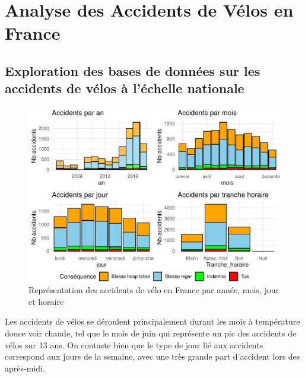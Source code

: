 \documentclass[french,]{compterendu}
\theoremstyle{urcastyle}
\theoremstyle{remark}
\begin{document}
\hypertarget{analyse-des-accidents-de-vuxe9los-en-france}{%
\section{Analyse des Accidents de Vélos en France}\label{analyse-des-accidents-de-vuxe9los-en-france}}

\hypertarget{exploration-des-bases-de-donnuxe9es-sur-les-accidents-de-vuxe9los-uxe0-luxe9chelle-nationale}{%
\subsection{Exploration des bases de données sur les accidents de vélos à l'échelle nationale}\label{exploration-des-bases-de-donnuxe9es-sur-les-accidents-de-vuxe9los-uxe0-luxe9chelle-nationale}}

\begin{figure}[H]

{\centering \includegraphics[width=1\linewidth]{Rapport_ADD_LEO-GABET_files/figure-latex/accfrancedetail-1} 

}

\caption{Représentation des accidents de vélo en France par année, mois, jour et horaire}\label{fig:accfrancedetail}
\end{figure}

Les accidents de vélos se déroulent principalement durant les mois à température douce voir chaude, tel que le mois de juin qui représente un pic des accidents de vélos sur 13 ans.
On contaste bien que le type de jour lié aux accidents correspond aux jours de la semaine, avec une très grande part d'accident lors des après-midi.
\end{document}
